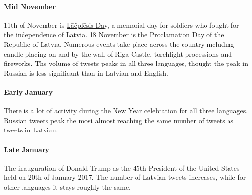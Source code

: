 \documentclass[11pt,a4paper]{article}
\begin{document}
\paragraph{Mid November}

11th of November is \href{https://en.wikipedia.org/wiki/L\%C4\%81\%C4\%8Dpl\%C4\%93sis_Day}{L\={a}\v{c}pl\={e}sis Day}, a memorial day for soldiers who fought for the independence of Latvia. 18 November is the Proclamation Day of the Republic of Latvia. Numerous events take place across the country including candle placing on and by the wall of Riga Castle, torchlight processions and fireworks. The volume of tweets peaks in all three languages, thought the peak in Russian is less significant than in Latvian and English.



\paragraph{Early January}

There is a lot of activity during the New Year celebration for all three languages. Russian tweets peak the most almost reaching the same number of tweets as tweets in Latvian.

\paragraph{Late January}



The inauguration of Donald Trump as the 45th President of the United States held on 20th of January 2017. The number of Latvian tweets increases, while for other languages it stays roughly the same.



\end{document}
